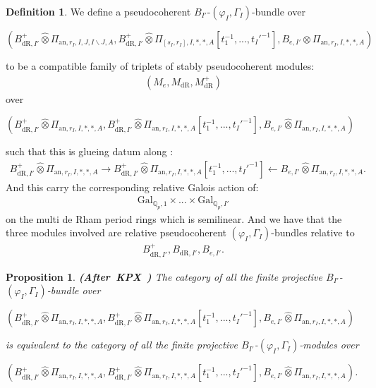 \documentclass[12pt]{amsart}
\newtheorem{proposition}[theorem]{Proposition}
\theoremstyle{definition}
\newtheorem{definition}[theorem]{Definition}
\numberwithin{equation}{section}
\begin{document}
\begin{definition}
We define a pseudocoherent $B_{I'}$-$(\varphi_I,\Gamma_I)$-bundle over
\begin{center}
$(B^+_{\mathrm{dR},I'}	\widehat{\otimes}\Pi_{\mathrm{an},r_{I},I,J,I\backslash J,A},B^+_{\mathrm{dR},I'}	\widehat{\otimes}\Pi_{[s_I,r_I],I,*,*,A}[t_1^{-1},...,t_I'^{-1}],B_{e,I'}	\widehat{\otimes}\Pi_{\mathrm{an},r_{I},I,*,*,A})$	
\end{center}
to be a compatible family of triplets of stably pseudocoherent modules:
\begin{align}
(M_e,M_{\mathrm{dR}},M^+_{\mathrm{dR}})	
\end{align}
over 
\begin{center}
$(B^+_{\mathrm{dR},I'}	\widehat{\otimes}\Pi_{\mathrm{an},r_{I},I,*,*,A},B^+_{\mathrm{dR},I'}	\widehat{\otimes}\Pi_{\mathrm{an},r_{I},I,*,*,A}[t_1^{-1},...,t_I'^{-1}],B_{e,I'}	\widehat{\otimes}\Pi_{\mathrm{an},r_{I},I,*,*,A})$	
\end{center}
such that this is glueing datum along :
\begin{align}
B^+_{\mathrm{dR},I'}	\widehat{\otimes}\Pi_{\mathrm{an},r_{I},I,*,*,A}\rightarrow B^+_{\mathrm{dR},I'}	\widehat{\otimes}\Pi_{\mathrm{an},r_{I},I,*,*,A}[t_1^{-1},...,t_I'^{-1}] \leftarrow B_{e,I'}	\widehat{\otimes}\Pi_{\mathrm{an},r_{I},I,*,*,A}.	
\end{align}
And this carry the corresponding relative Galois action of:
\begin{align}
\mathrm{Gal}_{\mathbb{Q}_p,1}\times...\times \mathrm{Gal}_{\mathbb{Q}_p,I'}		
\end{align}
on the multi de Rham period rings which is semilinear. And we have that the three modules involved are relative pseudocoherent $(\varphi_I,\Gamma_I)$-bundles relative to
\begin{align}
B^+_{\mathrm{dR},I'},B_{\mathrm{dR},I'},B_{e,I'}.	
\end{align}

	
\end{definition}



\begin{proposition} \mbox{\bf{(After KPX \cite[Proposition 2.2.7]{KPX})}}
The category of all the finite projective $B_{I'}$-$(\varphi_I,\Gamma_I)$-bundle over 
\begin{center}
$(B^+_{\mathrm{dR},I'}	\widehat{\otimes}\Pi_{\mathrm{an},r_{I},I,*,*,A},B^+_{\mathrm{dR},I'}	\widehat{\otimes}\Pi_{\mathrm{an},r_{I},I,*,*,A}[t_1^{-1},...,t_I'^{-1}],B_{e,I'}	\widehat{\otimes}\Pi_{\mathrm{an},r_{I},I,*,*,A})$	
\end{center}
is equivalent to the category of all the finite projective $B_{I'}$-$(\varphi_I,\Gamma_I)$-modules over 
\begin{center}
$(B^+_{\mathrm{dR},I'}	\widehat{\otimes}\Pi_{\mathrm{an},r_{I},I,*,*,A},B^+_{\mathrm{dR},I'}	\widehat{\otimes}\Pi_{\mathrm{an},r_{I},I,*,*,A}[t_1^{-1},...,t_I'^{-1}],B_{e,I'}	\widehat{\otimes}\Pi_{\mathrm{an},r_{I},I,*,*,A})$.	
\end{center}
\end{proposition}
\end{document}
